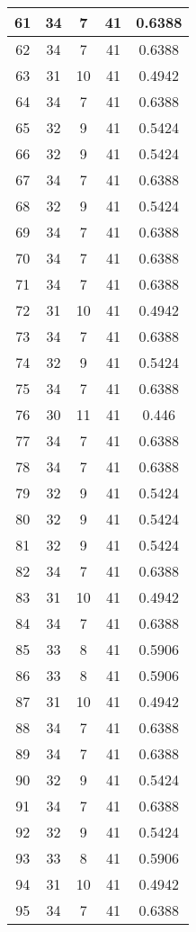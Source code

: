 \documentclass[letterpaper, 12pt]{article}
\begin{document}
\begin{longtable}{|c|c|c|c|c|}
61 & 34 & 7 & 41 & 0.6388 \\
\hline
62 & 34 & 7 & 41 & 0.6388 \\
\hline
63 & 31 & 10 & 41 & 0.4942 \\
\hline
64 & 34 & 7 & 41 & 0.6388 \\
\hline
65 & 32 & 9 & 41 & 0.5424 \\
\hline
66 & 32 & 9 & 41 & 0.5424 \\
\hline
67 & 34 & 7 & 41 & 0.6388 \\
\hline
68 & 32 & 9 & 41 & 0.5424 \\
\hline
69 & 34 & 7 & 41 & 0.6388 \\
\hline
70 & 34 & 7 & 41 & 0.6388 \\
\hline
71 & 34 & 7 & 41 & 0.6388 \\
\hline
72 & 31 & 10 & 41 & 0.4942 \\
\hline
73 & 34 & 7 & 41 & 0.6388 \\
\hline
74 & 32 & 9 & 41 & 0.5424 \\
\hline
75 & 34 & 7 & 41 & 0.6388 \\
\hline
76 & 30 & 11 & 41 & 0.446 \\
\hline
77 & 34 & 7 & 41 & 0.6388 \\
\hline
78 & 34 & 7 & 41 & 0.6388 \\
\hline
79 & 32 & 9 & 41 & 0.5424 \\
\hline
80 & 32 & 9 & 41 & 0.5424 \\
\hline
81 & 32 & 9 & 41 & 0.5424 \\
\hline
82 & 34 & 7 & 41 & 0.6388 \\
\hline
83 & 31 & 10 & 41 & 0.4942 \\
\hline
84 & 34 & 7 & 41 & 0.6388 \\
\hline
85 & 33 & 8 & 41 & 0.5906 \\
\hline
86 & 33 & 8 & 41 & 0.5906 \\
\hline
87 & 31 & 10 & 41 & 0.4942 \\
\hline
88 & 34 & 7 & 41 & 0.6388 \\
\hline
89 & 34 & 7 & 41 & 0.6388 \\
\hline
90 & 32 & 9 & 41 & 0.5424 \\
\hline
91 & 34 & 7 & 41 & 0.6388 \\
\hline
92 & 32 & 9 & 41 & 0.5424 \\
\hline
93 & 33 & 8 & 41 & 0.5906 \\
\hline
94 & 31 & 10 & 41 & 0.4942 \\
\hline
95 & 34 & 7 & 41 & 0.6388 \\

\end{longtable}
\end{document}
